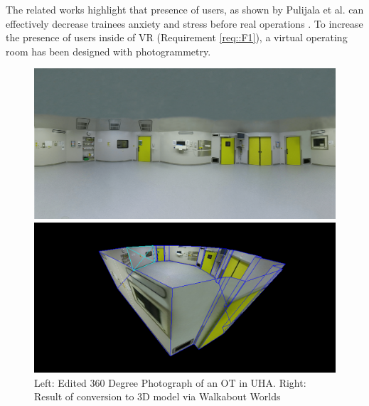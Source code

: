 The related works highlight that presence of users, as shown by Pulijala et al. can effectively decrease trainees anxiety and stress before real operations \cite{Pulijala.2017}.
To increase the presence of users inside of VR (Requirement \ref{req::F1}), a virtual operating room has been designed with photogrammetry.

\begin{figure}[ht]
    \centering
    \begin{minipage}{.5\textwidth}
      \centering
      \includegraphics[width=0.99\linewidth]{images/implementation/vot/operating_room_360.png}
    \end{minipage}%
    \begin{minipage}{.5\textwidth}
      \centering
      \includegraphics[width=0.99\linewidth]{images/implementation/vot/walkabout_worlds.png}
    \end{minipage}
    \caption{\label{fig::360OperatingRoom}Left: Edited 360 Degree Photograph of an OT in UHA. Right: Result of conversion to 3D model via Walkabout Worlds}
\end{figure}

